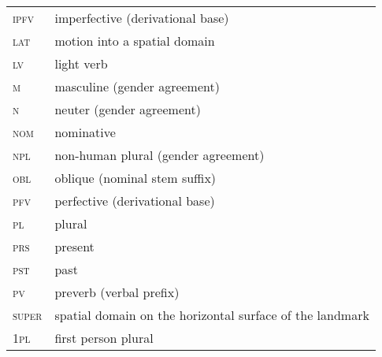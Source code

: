 ﻿\documentclass[output=paper]{langsci/langscibook}
\begin{document}
\begin{longtable}[l]{@{}ll@{}}
\textsc{ipfv}	& imperfective (derivational base) \\
\textsc{lat}	& motion into a spatial domain \\
\textsc{lv}	& light verb \\
\textsc{m}	& masculine (gender agreement) \\
\textsc{n}	& neuter (gender agreement) \\
\textsc{nom}	& nominative \\
\textsc{npl}	& non-human plural (gender agreement) \\
\textsc{obl}	& oblique (nominal stem suffix) \\
\textsc{pfv}	& perfective (derivational base) \\
\textsc{pl}	& plural \\
\textsc{prs}	& present \\
\textsc{pst}	& past \\
\textsc{pv}	& preverb (verbal prefix) \\
\textsc{super}	& spatial domain on the horizontal surface of the landmark \\
\textsc{1pl}	& first person plural \\
\end{longtable}



\printbibliography[heading=subbibliography,notkeyword=this]
\end{document}
